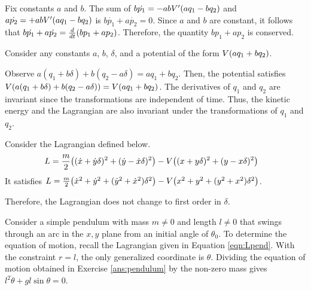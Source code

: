 \begin{answer}
	Fix constants $a$ and $b$.
	The sum of $b \dot{p_1} = -ab V'\!\left(a q_1 - b q_2\right)$ and $a \dot{p_2} = +ab V'\!\left(a q_1 - b q_2\right)$ is $b \dot{p_1} + a \dot{p_2} = 0$.
	Since $a$ and $b$ are constant, it follows that $b \dot{p_1} + a \dot{p_2} = \frac{d}{dt}\!\left(b p_1 + a p_2\right)$.
	Therefore, the quantity $b p_1 + a p_2$ is conserved.
\end{answer}

\begin{answer}
	Consider any constants $a$, $b$, $\delta$, and a potential of the form $V\!\left(a q_1 + b q_2\right)$.

	Observe $a\left(q_1 + b\delta\right) + b\left(q_2 - a \delta\right) = a q_1 + b q_2$.
	Then, the potential satisfies $V\!\left(a(q_1 + b\delta) + b(q_2 - a \delta)\right) = V\!\left(a q_1 + b q_2\right)$.
	The derivatives of $q_1$ and $q_2$ are invariant since the transformations are independent of time.
	Thus, the kinetic energy and the Lagrangian are also invariant under the transformations of $q_1$ and $q_2$.
\end{answer}

\begin{answer}
	Consider the Lagrangian defined below.
	\begin{align}
		L & = \frac{m}{2}\!\left((\dot{x} + \dot{y} \delta)^2 + (\dot{y} - \dot{x} \delta)^2\right) - V\!\left((x + y \delta)^2 + (y - x \delta)^2\right)
	\end{align}
	It satisfies $L = \frac{m}{2}\!\left(\dot{x}^2 + \dot{y}^2 + (\dot{y}^2 + \dot{x}^2)\delta^2\right) - V\!\left(x^2 + y^2 + (y^2 + x^2) \delta^2\right)$.

	Therefore, the Lagrangian does not change to first order in $\delta$.
\end{answer}

\begin{answer}
	Consider a simple pendulum with mass $m \neq 0$ and length $l \neq 0$ that swings through an arc in the $x,y$ plane from an initial angle of $\theta_0$.
	To determine the equation of motion, recall the Lagrangian given in Equation \eqref{eqn:Lpend}.
	With the constraint $r=l$, the only generalized coordinate is $\theta$.
	Dividing the equation of motion obtained in Exercise \ref{ans:pendulum} by the non-zero mass gives $l^2 \ddot{\theta} + g l \sin \theta = 0$.
\end{answer}

